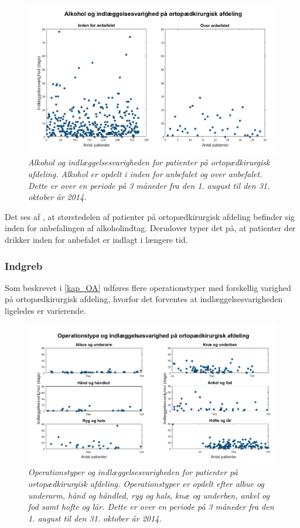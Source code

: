 \begin{figure}[H]
	\centering
	\includegraphics[scale=0.55]{figures/alkohologindlaeg}
	\caption{\textit{Alkohol og indlæggelsesvarigheden for patienter på ortopædkirurgisk afdeling. Alkohol er opdelt i inden for anbefalet og over anbefalet. Dette er over en periode på 3 måneder fra den 1. august til den 31. oktober år 2014. }}
	\label{alkohologindlaeggelse}
\end{figure}


\noindent
Det ses af , at størstedelen af patienter på ortopædkirurgisk afdeling befinder sig inden for anbefalingen af alkoholindtag. Derudover typer det på, at patienter der drikker inden for anbefalet er indlagt i længere tid. 


\subsubsection{Indgreb}
Som beskrevet i \ref{kap_OA} udføres flere operationstyper med forskellig varighed på ortopædkirurgisk afdeling, hvorfor det forventes at indlæggelsesvarigheden ligeledes er varierende. 


\begin{figure}[H]
	\centering
	\includegraphics[scale=0.5]{figures/operaogindlaeg}
	\caption{\textit{Operationstyper og indlæggelsesvarigheden for patienter på ortopædkirurgisk afdeling. Operationstyper er opdelt efter albue og underarm, hånd og håndled, ryg og hals, knæ og underben, ankel og fod samt hofte og lår. Dette er over en periode på 3 måneder fra den 1. august til den 31. oktober år 2014.}}
	\label{opvsindlaegtid}
\end{figure}



